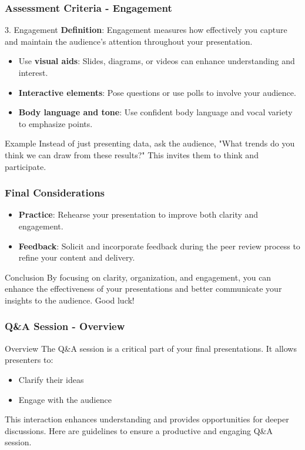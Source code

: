 \documentclass[aspectratio=169]{beamer}
\begin{document}
\begin{frame}[fragile]
    \frametitle{Assessment Criteria - Engagement}
    \begin{block}{3. Engagement}
        \textbf{Definition}: Engagement measures how effectively you capture and maintain the audience's attention throughout your presentation.
    \end{block}
    
    \begin{itemize}
        \item Use \textbf{visual aids}: Slides, diagrams, or videos can enhance understanding and interest.
        \item \textbf{Interactive elements}: Pose questions or use polls to involve your audience.
        \item \textbf{Body language and tone}: Use confident body language and vocal variety to emphasize points.
    \end{itemize}

    \begin{block}{Example}
        Instead of just presenting data, ask the audience, "What trends do you think we can draw from these results?" This invites them to think and participate.
    \end{block}
\end{frame}

\begin{frame}[fragile]
    \frametitle{Final Considerations}
    \begin{itemize}
        \item \textbf{Practice}: Rehearse your presentation to improve both clarity and engagement.
        \item \textbf{Feedback}: Solicit and incorporate feedback during the peer review process to refine your content and delivery.
    \end{itemize}
    
    \begin{block}{Conclusion}
        By focusing on clarity, organization, and engagement, you can enhance the effectiveness of your presentations and better communicate your insights to the audience. Good luck!
    \end{block}
\end{frame}

\begin{frame}[fragile]
    \frametitle{Q\&A Session - Overview}
    \begin{block}{Overview}
        The Q\&A session is a critical part of your final presentations. It allows presenters to:
        \begin{itemize}
            \item Clarify their ideas
            \item Engage with the audience
        \end{itemize}
        This interaction enhances understanding and provides opportunities for deeper discussions. Here are guidelines to ensure a productive and engaging Q\&A session.
    \end{block}
\end{frame}
\end{document}
